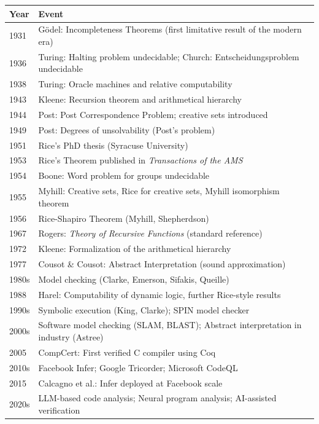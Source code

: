 \begin{tabularx}{\linewidth}{|l|X|}
\hline
\textbf{Year} & \textbf{Event} \\ \hline
1931 & G\"odel: Incompleteness Theorems (first limitative result of the modern era) \\ \hline
1936 & Turing: Halting problem undecidable; Church: Entscheidungsproblem undecidable \\ \hline
1938 & Turing: Oracle machines and relative computability \\ \hline
1943 & Kleene: Recursion theorem and arithmetical hierarchy \\ \hline
1944 & Post: Post Correspondence Problem; creative sets introduced \\ \hline
1949 & Post: Degrees of unsolvability (Post's problem) \\ \hline
1951 & Rice's PhD thesis (Syracuse University) \\ \hline
1953 & Rice's Theorem published in \emph{Transactions of the AMS} \\ \hline
1954 & Boone: Word problem for groups undecidable \\ \hline
1955 & Myhill: Creative sets, Rice for creative sets, Myhill isomorphism theorem \\ \hline
1956 & Rice-Shapiro Theorem (Myhill, Shepherdson) \\
 \hline
1967 & Rogers: \emph{Theory of Recursive Functions} (standard reference) \\
 \hline
1972 & Kleene: Formalization of the arithmetical hierarchy \\
 \hline
1977 & Cousot \& Cousot: Abstract Interpretation (sound approximation) \\
 \hline
1980s & Model checking (Clarke, Emerson, Sifakis, Queille) \\
 \hline
1988 & Harel: Computability of dynamic logic, further Rice-style results \\
 \hline
1990s & Symbolic execution (King, Clarke); SPIN model checker \\
 \hline
2000s & Software model checking (SLAM, BLAST); Abstract interpretation in industry (Astree) \\
 \hline
2005 & CompCert: First verified C compiler using Coq \\
 \hline
2010s & Facebook Infer; Google Tricorder; Microsoft CodeQL \\
 \hline
2015 & Calcagno et al.: Infer deployed at Facebook scale \\
 \hline
2020s & LLM-based code analysis; Neural program analysis; AI-assisted verification \\
 \hline
\end{tabularx}

